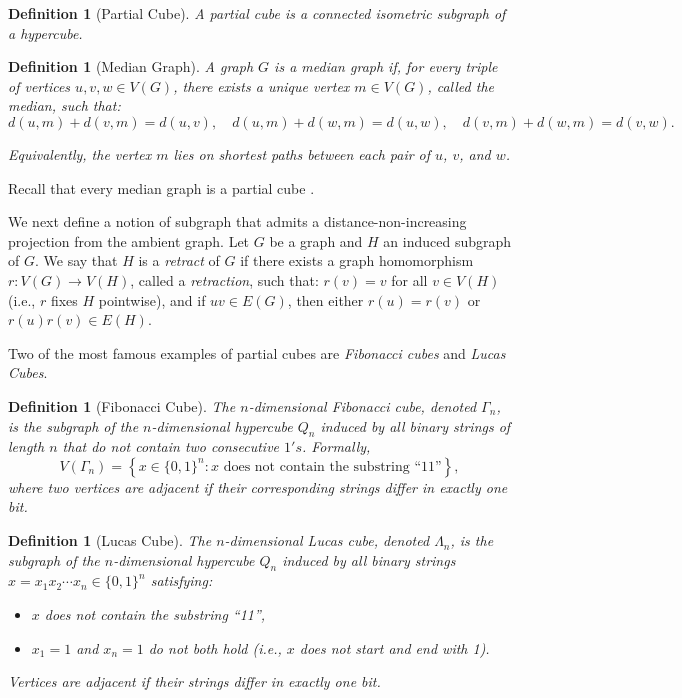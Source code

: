 \documentclass[11pt]{article}
\newtheorem{definition}[theorem]{Definition}
\begin{document}
\begin{definition}[Partial Cube]
    A \emph{partial cube} is a connected isometric subgraph of a hypercube.
\end{definition}


\begin{definition}[Median Graph]
A graph $G$ is a \emph{median graph} if, for every triple of vertices $u, v, w \in V(G)$, there exists a unique vertex $m \in V(G)$, called the \emph{median}, such that:
\[
d(u, m) + d(v, m) = d(u, v), \quad
d(u, m) + d(w, m) = d(u, w), \quad
d(v, m) + d(w, m) = d(v, w).
\]

Equivalently, the vertex $m$ lies on shortest paths between each pair of $u$, $v$, and $w$.
\end{definition}

Recall that every median graph is a partial cube \cite[Theorem 5.75]{ovchinnikov-2011}. 

We next define a notion of subgraph that admits a distance-non-increasing projection from the ambient graph. Let $G$ be a graph and $H$ an induced subgraph of $G$. We say that $H$ is a \emph{retract} of $G$ if there exists a graph homomorphism $r : V(G) \to V(H)$, called a \emph{retraction}, such that:
    $r(v) = v$ for all $v \in V(H)$ (i.e., $r$ fixes $H$ pointwise), and 
    if $uv \in E(G)$, then either $r(u) = r(v)$ or $r(u)r(v) \in E(H)$.

Two of the most famous examples of partial cubes are \emph{Fibonacci cubes} and \emph{Lucas Cubes}. 

\begin{definition}[Fibonacci Cube]
The \emph{$n$-dimensional Fibonacci cube}, denoted $\Gamma_n$, is the subgraph of the $n$-dimensional hypercube $Q_n$ induced by all binary strings of length $n$ that do not contain two consecutive $1's$. Formally,
\[
V(\Gamma_n) = \left\{ x \in \{0,1\}^n : \text{$x$ does not contain the substring ``11''} \right\},
\]
where two vertices are adjacent if their corresponding strings differ in exactly one bit.
\end{definition}

\begin{definition}[Lucas Cube]
The \emph{$n$-dimensional Lucas cube}, denoted $\Lambda_n$, is the subgraph of the $n$-dimensional hypercube $Q_n$ induced by all binary strings $x = x_1x_2\cdots x_n \in \{0,1\}^n$ satisfying:
\begin{itemize}
    \item $x$ does not contain the substring ``11'',
    \item $x_1 = 1$ and $x_n = 1$ do not both hold (i.e., $x$ does not start and end with 1).
\end{itemize}
Vertices are adjacent if their strings differ in exactly one bit.
\end{definition}
\end{document}
